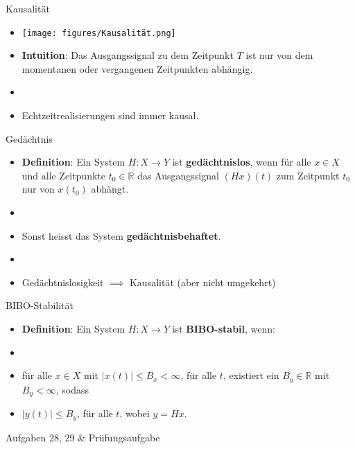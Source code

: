 \documentclass[14pt, aspectratio=169, handout]{beamer}
\begin{document}
\begin{frame}{Kausalität}
    \begin{itemize}
        \item[] \begin{center}
        \texttt{[image: figures/Kausalität.png]}
        \end{center}
        \item \textbf{Intuition}: Das Ausgangssignal zu dem Zeitpunkt $T$ ist nur von dem momentanen oder vergangenen Zeitpunkten abhängig.
        \item[] 
        \item Echtzeitrealisierungen sind immer kausal.
    \end{itemize}
\end{frame}

\begin{frame}{Gedächtnis}
    \begin{itemize}
        \item \textbf{Definition}: Ein System $H:X \to Y$ ist \textbf{gedächtnislos}, wenn für alle $x\in X$ und alle Zeitpunkte $t_0 \in \mathbb{R}$ das Ausgangssignal $(Hx)(t)$ zum Zeitpunkt $t_0$ nur von $x(t_0)$ abhängt.
        \item[] 
        \item Sonst heisst das System \textbf{gedächtnisbehaftet}.
        \item[] 
        \item Gedächtnislosigkeit $\implies$ Kausalität (aber nicht umgekehrt)
    \end{itemize}
\end{frame}

\begin{frame}{BIBO-Stabilität}
    \begin{itemize}
        \item \textbf{Definition}: Ein System $H:X\to Y$ ist \textbf{BIBO-stabil}, wenn: 
        \item[] 
        \item[] für alle $x\in X$ mit $|x(t)| \leq B_x < \infty$, für alle $t$, existiert ein $B_y \in \mathbb{R}$ mit $B_y < \infty$, sodass 
        \item[] \vspace{0.25cm} $|y(t)| \leq B_y$, für alle $t$, wobei $y=Hx$.

    \end{itemize}
\end{frame}

\begin{frame}{Aufgaben 28, 29 \& Prüfungsaufgabe}
    
\end{frame}
\end{document}
